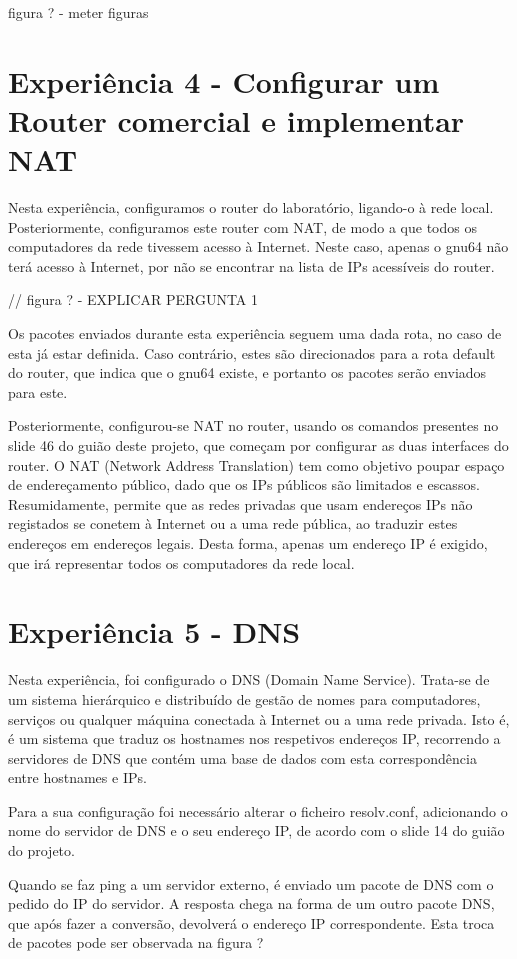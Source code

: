 \documentclass[article, a4paper, 11pt, oneside]{memoir}
\begin{document}
figura ? - meter figuras

\section{Experiência 4 - Configurar um Router comercial e implementar NAT}

Nesta experiência, configuramos o router do laboratório, ligando-o à rede local. Posteriormente, configuramos este router
com NAT, de modo a que todos os computadores da rede tivessem acesso à Internet. Neste caso, apenas o gnu64 não terá acesso à Internet, por não se encontrar na lista de IPs acessíveis do router.

// figura ? - EXPLICAR PERGUNTA 1

Os pacotes enviados durante esta experiência seguem uma dada rota, no caso de esta já estar definida. Caso contrário, estes são direcionados para a rota default do router,
que indica que o gnu64 existe, e portanto os pacotes serão enviados para este.

Posteriormente, configurou-se NAT no router, usando os comandos presentes no slide 46 do guião deste projeto, que começam por configurar as duas interfaces do router.
O NAT (Network Address Translation) tem como objetivo poupar espaço de endereçamento público, dado que os IPs públicos são limitados e escassos.
Resumidamente, permite que as redes privadas que usam endereços IPs não registados se conetem à Internet ou a uma rede pública, ao traduzir estes endereços em endereços legais. 
Desta forma, apenas um endereço IP é exigido, que irá representar todos os computadores da rede local.

\section{Experiência 5 - DNS}			

Nesta experiência, foi configurado o DNS (Domain Name Service). Trata-se de um sistema hierárquico e distribuído de gestão de nomes para computadores, serviços ou qualquer máquina conectada à Internet ou a uma rede privada.
Isto é, é um sistema que traduz os hostnames nos respetivos endereços IP, recorrendo a servidores de DNS que contém uma base de dados com esta correspondência entre hostnames e IPs.

Para a sua configuração foi necessário alterar o ficheiro resolv.conf, adicionando o nome do servidor de DNS e o seu endereço IP, de acordo com o slide 14 do guião do projeto.

Quando se faz ping a um servidor externo, é enviado um pacote de DNS com o pedido do IP do servidor. A resposta chega na forma de um outro pacote DNS, que após fazer a conversão, devolverá o endereço IP correspondente.
Esta troca de pacotes pode ser observada na figura ?
\end{document}
